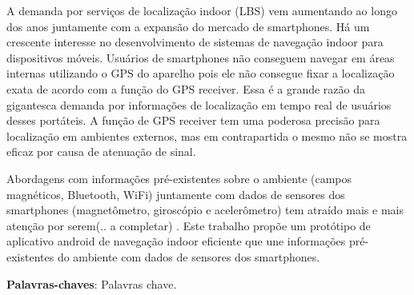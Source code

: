 \begin{resumo}
A demanda por serviços de localização indoor (LBS) vem aumentando ao longo dos anos juntamente com
a expansão do mercado de smartphones. Há um crescente interesse no desenvolvimento de sistemas de navegação indoor para dispositivos móveis. Usuários de smartphones não conseguem navegar em áreas internas utilizando o GPS do aparelho pois ele não consegue fixar a localização exata de acordo com a função do GPS receiver. Essa é a grande razão da gigantesca demanda por informações de localização em tempo real de usuários desses portáteis. A função de GPS receiver tem uma poderosa precisão para localização em ambientes externos, mas em contrapartida o mesmo não se mostra eficaz por causa de atenuação de sinal.

Abordagens com informações pré-existentes sobre o ambiente (campos magnéticos, Bluetooth, WiFi) juntamente com dados de sensores dos smartphones (magnetômetro, giroscópio e acelerômetro) tem atraído mais e mais atenção por serem(.. a completar) . Este trabalho propõe um protótipo de aplicativo android de navegação indoor eficiente que une informações pré-existentes do ambiente com dados de sensores dos smartphones.


\vspace{\onelineskip}
\noindent
\textbf{Palavras-chaves}: Palavras chave.
\end{resumo}
